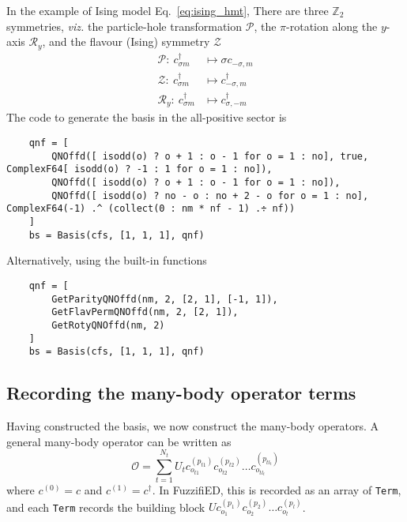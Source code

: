 \documentclass{timesjhep}
\begin{document}
In the example of Ising model Eq.~\eqref{eq:ising_hmt}, There are three $\mathbb{Z}_2$ symmetries, \textit{viz.} the particle-hole transformation $\mathcal{P}$, the $\pi$-rotation along the $y$-axis $\mathcal{R}_y$, and the flavour (Ising) symmetry $\mathcal{Z}$
\begin{align}
    \mathcal{P}:\ c^\dagger_{\sigma m}&\mapsto\sigma c_{-\sigma,m}\nonumber\\
    \mathcal{Z}:\ c^\dagger_{\sigma m}&\mapsto c^\dagger_{-\sigma,m}\nonumber\\
    \mathcal{R}_y:\ c^\dagger_{\sigma m}&\mapsto c^\dagger_{\sigma,-m}
\end{align}
The code to generate the basis in the all-positive sector is 
\begin{lstlisting}
    qnf = [
        QNOffd([ isodd(o) ? o + 1 : o - 1 for o = 1 : no], true, ComplexF64[ isodd(o) ? -1 : 1 for o = 1 : no]),
        QNOffd([ isodd(o) ? o + 1 : o - 1 for o = 1 : no]),
        QNOffd([ isodd(o) ? no - o : no + 2 - o for o = 1 : no], ComplexF64(-1) .^ (collect(0 : nm * nf - 1) .÷ nf))
    ]
    bs = Basis(cfs, [1, 1, 1], qnf) 
\end{lstlisting}
Alternatively, using the built-in functions
\begin{lstlisting}
    qnf = [ 
        GetParityQNOffd(nm, 2, [2, 1], [-1, 1]), 
        GetFlavPermQNOffd(nm, 2, [2, 1]), 
        GetRotyQNOffd(nm, 2) 
    ]
    bs = Basis(cfs, [1, 1, 1], qnf)
\end{lstlisting}

\subsection{Recording the many-body operator terms}
\label{sec:ed_term}

Having constructed the basis, we now construct the many-body operators. A general many-body operator can be written as
\begin{equation}
    \mathscr{O} =\sum_{t=1}^{N_t}U_tc^{(p_{t1})}_{o_{t1}}c^{(p_{t2})}_{o_{t2}}\dots c^{(p_{tl_t})}_{o_{tl_t}}
\end{equation}
where $c^{(0)}=c$ and $c^{(1)}=c^\dagger$. In FuzzifiED, this is recorded as an array of \lstinline|Term|, and each \lstinline|Term| records the building block $Uc^{(p_{1})}_{o_{1}}c^{(p_{2})}_{o_{2}}\dots c^{(p_{l})}_{o_{l}}$. 
\end{document}
